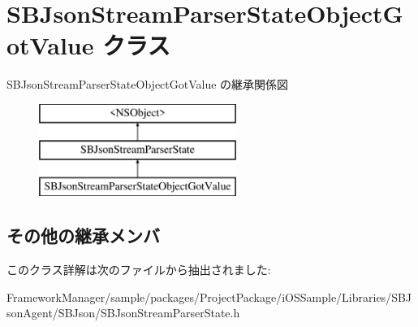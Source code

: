 \hypertarget{interface_s_b_json_stream_parser_state_object_got_value}{}\section{S\+B\+Json\+Stream\+Parser\+State\+Object\+Got\+Value クラス}
\label{interface_s_b_json_stream_parser_state_object_got_value}
S\+B\+Json\+Stream\+Parser\+State\+Object\+Got\+Value の継承関係図\begin{figure}[H]
\begin{center}
\leavevmode
\includegraphics[height=3.000000cm]{interface_s_b_json_stream_parser_state_object_got_value}
\end{center}
\end{figure}
\subsection*{その他の継承メンバ}


このクラス詳解は次のファイルから抽出されました\+:\begin{DoxyCompactItemize}
\item 
Framework\+Manager/sample/packages/\+Project\+Package/i\+O\+S\+Sample/\+Libraries/\+S\+B\+Json\+Agent/\+S\+B\+Json/S\+B\+Json\+Stream\+Parser\+State.\+h\end{DoxyCompactItemize}
